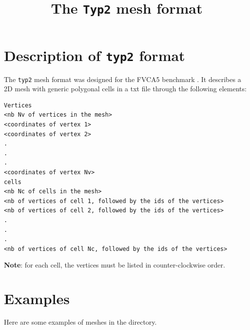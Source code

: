 \documentclass{article}
\title{The \texttt{Typ2} mesh format}
\begin{document}
\maketitle

\section{Description of \texttt{typ2} format}

The \texttt{typ2} mesh format was designed for the FVCA5 benchmark \cite{bench}.
It describes a 2D mesh with generic polygonal cells in a txt file through the following elements:

\begin{verbatim}
Vertices
<nb Nv of vertices in the mesh>
<coordinates of vertex 1>
<coordinates of vertex 2>
.
.
.
<coordinates of vertex Nv>
cells
<nb Nc of cells in the mesh>
<nb of vertices of cell 1, followed by the ids of the vertices>
<nb of vertices of cell 2, followed by the ids of the vertices>
.
.
.
<nb of vertices of cell Nc, followed by the ids of the vertices>
\end{verbatim}

\textbf{Note}: for each cell, the vertices must be listed in counter-clockwise order.

\section{Examples}

Here are some examples of meshes in the directory.
\end{document}
